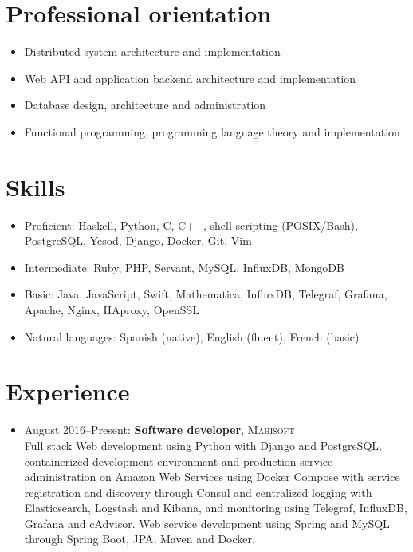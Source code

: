 \documentclass{res}
\begin{document}
\address{%
  \textbf{Computer engineering}, Universidad Sim\'on Bol\'{\i}var
  \\ Buenos Aires, Argentina
  \\ 1988--01--15
}
\address{%
  +54 9 (11) 2709-0039
  \\ \textsc{targen@gmail.com}
  \\ \textsc{http://keybase.io/mgomezch}
}

\begin{resume}

  \section{Professional orientation}
    \begin{itemize}
      \item Distributed system architecture and implementation
      \item Web API and application backend architecture and implementation
      \item Database design, architecture and administration
      \item Functional programming, programming language theory and implementation
    \end{itemize}

  \section{Skills}
    \begin{itemize}
      \item Proficient: Haskell, Python, C, C++, shell scripting (POSIX/Bash), PostgreSQL, Yesod, Django, Docker, Git, Vim
      \item Intermediate: Ruby, PHP, Servant, MySQL, InfluxDB, MongoDB
      \item Basic: Java, JavaScript, Swift, Mathematica, InfluxDB, Telegraf, Grafana, Apache, Nginx, HAproxy, OpenSSL
      \item Natural languages: Spanish (native), English (fluent), French (basic)
      \end{itemize}

\section{Experience}
  \begin{itemize}[leftmargin=-0.3in]
    \setlength\itemsep{1em}

    \item
      August 2016--Present: \textbf{Software developer}, \textsc{Mahisoft}
      \\ \small{Full stack Web development using Python with Django and PostgreSQL, containerized development environment and production service administration on Amazon Web Services using Docker Compose with service registration and discovery through Consul and centralized logging with Elasticsearch, Logstash and Kibana, and monitoring using Telegraf, InfluxDB, Grafana and cAdvisor.  Web service development using Spring and MySQL through Spring Boot, JPA, Maven and Docker.}


\end{itemize}
\end{resume}
\end{document}
